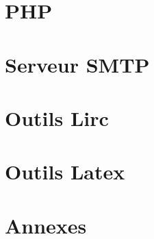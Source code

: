 


\part[PHP]{PHP \\\vspace*{2cm} }


\part{Serveur SMTP}


\part{Outils Lirc}


\part[Outils Latex]{Outils Latex \\\vspace*{2cm} \makebox{\centering \LaTeX}}





\part{Annexes}






\listoffigures




